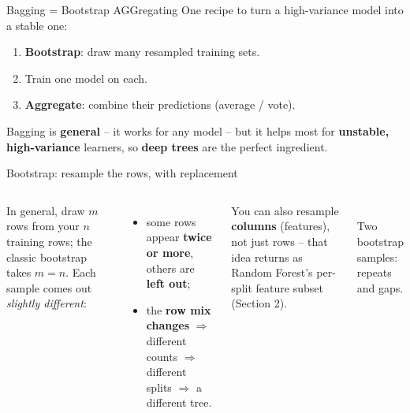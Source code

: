 \documentclass[aspectratio=169]{beamer}
\begin{document}
\begin{frame}{Bagging = Bootstrap AGGregating}
  One recipe to turn a high-variance model into a stable one:
  \begin{enumerate}\small
    \item \textbf{Bootstrap}: draw many resampled training sets.
    \item Train one model on each.
    \item \textbf{Aggregate}: combine their predictions (average / vote).
  \end{enumerate}
  \vfill
  Bagging is \textbf{general} -- it works for any model -- but it helps most for
  \textbf{unstable, high-variance} learners, so \textbf{deep trees} are the perfect
  ingredient.
  \vfill
\end{frame}

\begin{frame}{Bootstrap: resample the rows, with replacement}
  \begin{columns}[T]
    \vskip 5pt
    In general, draw $m$ rows from your $n$ training rows; the classic bootstrap takes
    $m = n$. Each sample comes out \emph{slightly different}:
    \begin{itemize}\small
      \item some rows appear \textbf{twice or more}, others are \textbf{left out};
      \item the \textbf{row mix changes} $\Rightarrow$ different counts $\Rightarrow$
        different splits $\Rightarrow$ a different tree.
    \end{itemize}
    \vskip 2pt
    \footnotesize You can also resample \textbf{columns} (features), not just rows -- that
    idea returns as Random Forest's per-split feature subset (Section 2).
    \begin{center}
      \\[-1pt]
      \scriptsize Two bootstrap samples: repeats and gaps.
    \end{center}
  \end{columns}
\end{frame}
\end{document}
